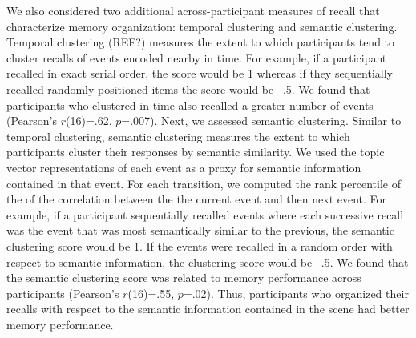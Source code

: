 \documentclass{article}
\begin{document}
{ We also considered two additional across-participant measures of recall that characterize memory organization: temporal clustering and semantic clustering. Temporal clustering (REF?) measures the extent to which participants tend to cluster recalls of events encoded nearby in time.  For example, if a participant recalled in exact serial order, the score would be 1 whereas if they sequentially recalled randomly positioned items the score would be ~.5.  We found that participants who clustered in time also recalled a greater number of events (Pearson's $r$(16)=.62, $p$=.007). Next, we assessed semantic clustering.  Similar to temporal clustering, semantic clustering measures the extent to which participants cluster their responses by semantic similarity.  We used the topic vector representations of each event as a proxy for semantic information contained in that event.  For each transition, we computed the rank percentile of the of the correlation between the the current event and then next event. For example, if a participant sequentially recalled events where each successive recall was the event that was most semantically similar to the previous, the semantic clustering score would be 1.  If the events were recalled in a random order with respect to semantic information, the clustering score would be ~.5. We found that the semantic clustering score was related to memory performance across participants (Pearson's $r$(16)=.55, $p$=.02).  Thus, participants who organized their recalls with respect to the semantic information contained in the scene had better memory performance.

}
\end{document}
